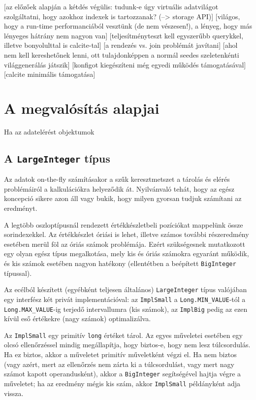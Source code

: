 \documentclass[
    parspace,
    noindent,
    nohyp,
]{elteiktdk}[2023/04/10]
\begin{document}
[az előzőek alapján a kétdés végülis: tudunk-e úgy virtuális adatvilágot szolgáltatni, hogy azokhoz indexek is tartozzanak? (--> storage API)]
[világos, hogy a run-time performanciából vesztünk (de nem vészesen!), a lényeg, hogy más lényeges hátrány nem nagyon van]
[teljesítményteszt kell egyszerűbb querykkel, illetve bonyolulttal is calcite-tal]
[a rendezés vs. join problémát javítani]
[ahol nem kell kereshetőnek lenni, ott tulajdonképpen a normál seedes szeletenkénti világgenerálás játszik]
[konfigot kiegészíteni még egyedi működés támogatásával]
[calcite minimális támogatása]



\section{A megvalósítás alapjai}

Ha az adatelérést objektumok

\subsection{A \texttt{LargeInteger} típus}

Az adatok on-the-fly számításakor a szűk keresztmetszet
a tárolás és elérés problémáiról a kalkulációkra helyeződik át.
Nyilvánvaló tehát, hogy az egész koncepció sikere azon áll vagy bukik,
hogy milyen gyorsan tudjuk számítani az eredményt.

A legtöbb oszloptípusnál rendezett értékkészletbeli pozíciókat mappelünk össze sorindexekkel.
Az értékkészlet óriási is lehet,
illetve számos további részeredmény esetében merül föl az óriás számok problémája.
Ezért szükségesnek mutatkozott egy olyan egész típus megalkotása,
mely kis és óriás számokra egyaránt működik,
és kis számok esetében nagyon hatékony (ellentétben a beépített \texttt{BigInteger} típussal).

Az ecélból készített (egyébként teljesen általános) \texttt{LargeInteger} típus
valójában egy interfész két privát implementációval:
az \texttt{ImplSmall} a \texttt{Long.MIN\_VALUE}-tól a \texttt{Long.MAX\_VALUE}-ig
terjedő intervallumra (kis számok),
az \texttt{ImplBig} pedig az ezen kívül eső értékekre (nagy számok) optimalizálva.

Az \texttt{ImplSmall} egy primitív \texttt{long} értéket tárol.
Az egyes műveletei esetében egy olcsó ellenőrzéssel mindig megállapítja,
hogy biztos-e, hogy nem lesz túlcsordulás.
Ha ez biztos, akkor a műveletet primitív műveletként végzi el.
Ha nem biztos
(vagy azért, mert az ellenőrzés nem zárta ki a túlcsordulást,
vagy mert nagy számot kapott operandusként),
akkor a \texttt{BigInteger} segítségével hajtja végre a műveletet;
ha az eredmény mégis kis szám, akkor \texttt{ImplSmall} példányként adja vissza.
\end{document}
